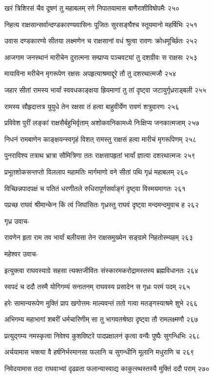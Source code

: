 खरं त्रिशिरसं चैव दूषणं तु महाबलम्
रणे निपातयामास बाणैराशीविषोपमैः २५०

निहत्य राक्षसान्सर्वान्दण्डकारण्यवासिनः
पूजितः सुरसङ्घैश्च स्तूयमानो महर्षिभिः २५१

उवास दण्डकारण्ये सीतया लक्ष्मणेन च
राक्षसानां वधं श्रुत्वा रावणः क्रोधमूर्च्छितः २५२

आजगाम जनस्थानं मारीचेन दुरात्मना
सम्प्राप्य पञ्चवट्यां तु दशग्रीवः स राक्षसः २५३

मायाविना मरीचेन मृगरूपेण रक्षसः
अपहृत्याश्रमाद्दूरे तौ तु दशरथात्मजौ २५४

जहार सीतां रामस्य भार्यां स्ववधकाङ्क्षया
ह्रियमाणां तु तां दृष्ट्वा जटायुर्गृध्रराड्बली २५५

रामस्य सौहृदात्तत्र युयुधे तेन रक्षसा
तं हत्वा बाहुवीर्येण रावणं शत्रुवारणः २५६

प्रविवेश पुरीं लङ्कां राक्षसैर्बहुभिर्वृताम्
अशोकवनिकामध्ये निःक्षिप्य जनकात्मजाम् २५७

निधनं रामबाणेन काङ्क्षयन्स्वगृहं विशत्
रामस्तु राक्षसं हत्वा मारीचं मृगरूपिणम् २५८

पुनराविश्य तत्राथ भ्रात्रा सौमित्रिणा ततः
राक्षसापहृतां भार्यां ज्ञात्वा दशरथात्मजः २५९

प्रभूतशोकसन्तप्तो विललाप महामतिः
मार्गमाणो वने सीतां पथि गृध्रं महाबलम् २६०

विच्छिन्नपादपक्षं च पतितं धरणीतले
रुधिरापूर्णसर्वाङ्गं दृष्ट्वा विस्मयमागतः २६१

पप्रच्छ राघवं श्रीमान्केन किं त्वं जिघांसितः
गृध्रस्तु राघवं दृष्ट्वा मन्दमन्दमुवाच ह २६२

गृध्र उवाच-

रावणेन हृता राम तव भार्यां बलीयसा
तेन राक्षसमुख्येन सङ्ग्रामे निहतोस्म्यहम् २६३

महेश्वर उवाच-

इत्युक्त्वा राघवस्याग्रे सहसा त्यक्तजीवितः
संस्कारमकरोद्रामस्तस्य ब्रह्मविधानतः २६४

स्वपदं च ददौ तस्मै योगिगम्यं सनातनम्
राघवस्य प्रसादेन स गृध्रः परमं पदम् २६५

हरेः सामान्यरूपेण मुक्तिं प्राप खगोत्तमः
माल्यवन्तं ततो गत्वा मतङ्गस्याश्रमे शुभे २६६

अभिगम्य महाभागां शबरीं धर्मचारिणीम्
सा तु भागवतश्रेष्ठा दृष्ट्वा तौ रामलक्ष्मणौ २६७

प्रत्युद्गम्य नमस्कृत्वा निवेश्य कुशविष्टरे
पादप्रक्षालनं कृत्वा वन्यैः पुष्पैः सुगन्धिभिः २६८

अर्चयामास भक्त्या वै हर्षनिर्भरमानसा
फलानि च सुगन्धीनि मूलानि मधुराणि च २६९

निवेदयामास तदा राघवाभ्यां दृढव्रता
फलान्यास्वाद्य काकुत्स्थस्तस्यै मुक्तिं ददौ पराम् २७०

